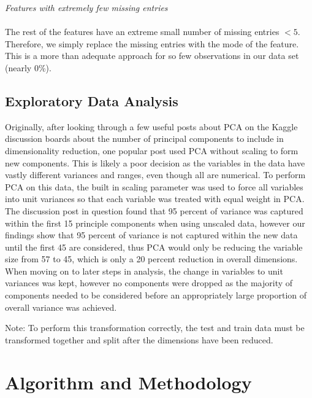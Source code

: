 \documentclass[fleqn,10pt]{SelfArx} %
\begin{document}
\newpage
\textit{Features with extremely few missing entries}\\
\\
The rest of the features have an extreme small number of missing entries \(<5\). Therefore, we simply replace the missing entries with the mode of the feature. This is a more than adequate approach for so few observations in our data set (nearly 0\%). \\

\subsection{Exploratory Data Analysis}

Originally, after looking through a few useful posts about PCA on the Kaggle discussion boards about the number of principal components to include in dimensionality reduction, one popular post used PCA without scaling to form new components. This is likely a poor decision as the variables in the data have vastly different variances and ranges, even though all are numerical. To perform PCA on this data, the built in scaling parameter was used to force all variables into unit variances so that each variable was treated with equal weight in PCA. The discussion post in question found that 95 percent of variance was captured within the first 15 principle components when using unscaled data, however our findings show that 95 percent of variance is not captured within the new data until the first 45 are considered, thus PCA would only be reducing the variable size from 57 to 45, which is only a 20 percent reduction in overall dimensions. When moving on to later steps in analysis, the change in variables to unit variances was kept, however no components were dropped as the majority of components needed to be considered before an appropriately large proportion of overall variance was achieved.

Note: To perform this transformation correctly, the test and train data must be transformed together and split after the dimensions have been reduced.
\bigskip
\bigskip


\section{Algorithm and Methodology}
\end{document}
